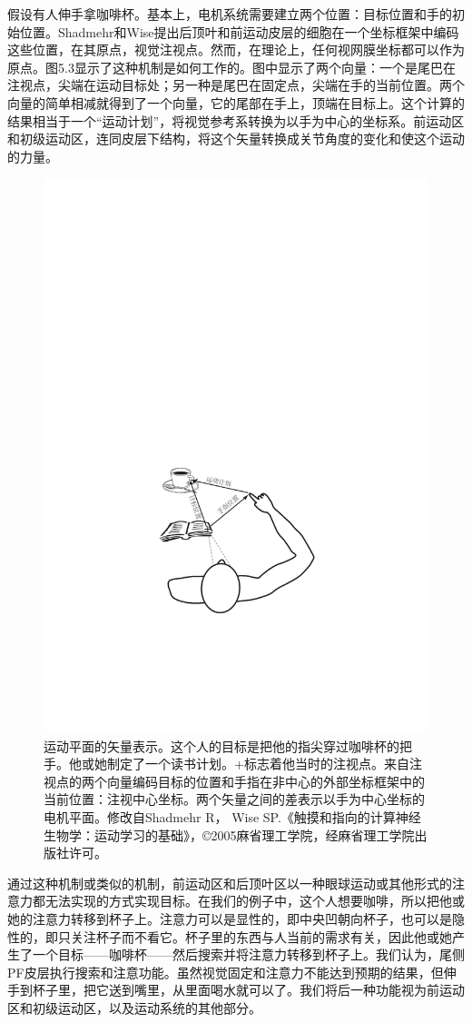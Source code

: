 假设有人伸手拿咖啡杯。基本上，电机系统需要建立两个位置：目标位置和手的初始位置。Shadmehr和Wise提出后顶叶和前运动皮层的细胞在一个坐标框架中编码这些位置，在其原点，视觉注视点。然而，在理论上，任何视网膜坐标都可以作为原点。图5.3显示了这种机制是如何工作的。图中显示了两个向量：一个是尾巴在注视点，尖端在运动目标处；另一种是尾巴在固定点，尖端在手的当前位置。两个向量的简单相减就得到了一个向量，它的尾部在手上，顶端在目标上。这个计算的结果相当于一个“运动计划”，将视觉参考系转换为以手为中心的坐标系。前运动区和初级运动区，连同皮层下结构，将这个矢量转换成关节角度的变化和使这个运动的力量。
\begin{figure}
	\centering
	\includegraphics[width=0.7\linewidth]{image_pfc/Fig_5_3}
	\caption{运动平面的矢量表示。这个人的目标是把他的指尖穿过咖啡杯的把手。他或她制定了一个读书计划。+标志着他当时的注视点。来自注视点的两个向量编码目标的位置和手指在非中心的外部坐标框架中的当前位置：注视中心坐标。两个矢量之间的差表示以手为中心坐标的电机平面。修改自Shadmehr R， Wise SP.《触摸和指向的计算神经生物学：运动学习的基础》，©2005麻省理工学院，经麻省理工学院出版社许可。}
	\label{fig:fig}
\end{figure}
通过这种机制或类似的机制，前运动区和后顶叶区以一种眼球运动或其他形式的注意力都无法实现的方式实现目标。在我们的例子中，这个人想要咖啡，所以把他或她的注意力转移到杯子上。注意力可以是显性的，即中央凹朝向杯子，也可以是隐性的，即只关注杯子而不看它。杯子里的东西与人当前的需求有关，因此他或她产生了一个目标——咖啡杯——然后搜索并将注意力转移到杯子上。我们认为，尾侧PF皮层执行搜索和注意功能。虽然视觉固定和注意力不能达到预期的结果，但伸手到杯子里，把它送到嘴里，从里面喝水就可以了。我们将后一种功能视为前运动区和初级运动区，以及运动系统的其他部分。

